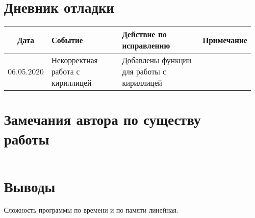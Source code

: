 \documentclass[12pt]{article}
\begin{document}
\section{Дневник отладки}
\begin{tabular}{|c|p{5cm}|p{5cm}|c|}
\hline
Дата & Событие & Действие по исправлению & Примечание \\
\hline
06.05.2020 & Некорректная работа с кириллицей & Добавлены функции для работы с кириллицей & \\
\hline
\end{tabular}

\section{Замечания автора по существу работы}

\begin{lstlisting}[language=lisp]

\end{lstlisting}

\section{Выводы}
Сложность программы по времени и по памяти линейная.
\end{document}
